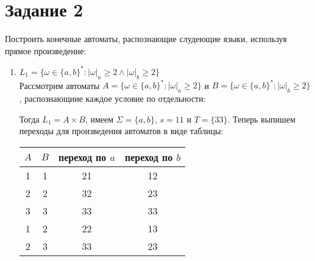 \documentclass{article}
\begin{document}
    \section*{Задание 2}
    Построить конечные автоматы, распознающие слудеющие языки, используя прямое произведение:
    \begin{enumerate}
        \item \(L_1=\{\omega\in\{a,b\}^* : |\omega|_a \geqslant 2 \wedge |\omega|_b
        \geqslant 2 \} \) \\
        Рассмотрим автоматы \(A=\{\omega\in\{a,b\}^* : |\omega|_a \geqslant 2 \} \) и \(B=\{\omega\in\{a,b\}^* : |\omega|_b \geqslant 2 \} \), распознающиие каждое условие по отдельности:
        \begin{center}
        \end{center}
        Тогда \(L_1=A \times B\), имеем \(\Sigma=\{a,b\}\), \(s=11\) и \(T=\{33\}\). Теперь выпишем переходы для произведения автоматов в виде таблицы:
        \begin{center}
            \begin{tabular}{ |c|c|c|c| } 
                \hline
                \(A\) & \(B\) & переход по \(a\) & переход по \(b\) \\
                \hline
                1 & 1 & 21 & 12 \\
                \hline
                2 & 2 & 32 & 23 \\
                \hline
                3 & 3 & 33 & 33 \\
                \hline
                1 & 2 & 22 & 13 \\
                \hline
                2 & 3 & 33 & 23 \\

\end{tabular}
\end{center}
\end{enumerate}
\end{document}
